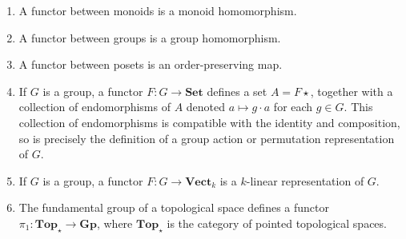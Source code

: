 \begin{example}
\begin{enumerate}
        \item A functor between monoids is a monoid homomorphism.
        \item A functor between groups is a group homomorphism.
        \item A functor between posets is an order-preserving map.
        \item If \( G \) is a group, a functor \( F : G \to \mathbf{Set} \) defines a set \( A = F \star \), together with a collection of endomorphisms of \( A \) denoted \( a \mapsto g \cdot a \) for each \( g \in G \).
        This collection of endomorphisms is compatible with the identity and composition, so is precisely the definition of a group action or permutation representation of \( G \).
        \item If \( G \) is a group, a functor \( F : G \to \mathbf{Vect}_k \) is a \( k \)-linear representation of \( G \).
        \item The fundamental group of a topological space defines a functor \( \pi_1 : \mathbf{Top}_\star \to \mathbf{Gp} \), where \( \mathbf{Top}_\star \) is the category of pointed topological spaces.
    \end{enumerate}
\end{example}

